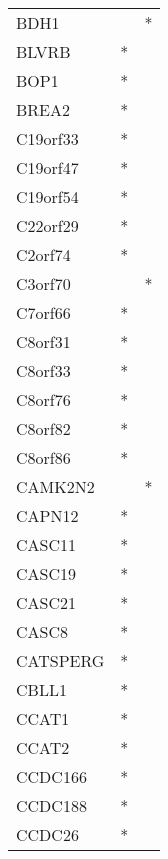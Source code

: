 \begin{longtable}{lcc}
BDH1             &                &          * \\
BLVRB            &              * &            \\
BOP1             &              * &            \\
BREA2            &              * &            \\
C19orf33         &              * &            \\
C19orf47         &              * &            \\
C19orf54         &              * &            \\
C22orf29         &              * &            \\
C2orf74          &              * &            \\
C3orf70          &                &          * \\
C7orf66          &              * &            \\
C8orf31          &              * &            \\
C8orf33          &              * &            \\
C8orf76          &              * &            \\
C8orf82          &              * &            \\
C8orf86          &              * &            \\
CAMK2N2          &                &          * \\
CAPN12           &              * &            \\
CASC11           &              * &            \\
CASC19           &              * &            \\
CASC21           &              * &            \\
CASC8            &              * &            \\
CATSPERG         &              * &            \\
CBLL1            &              * &            \\
CCAT1            &              * &            \\
CCAT2            &              * &            \\
CCDC166          &              * &            \\
CCDC188          &              * &            \\
CCDC26           &              * &            \\

\end{longtable}
